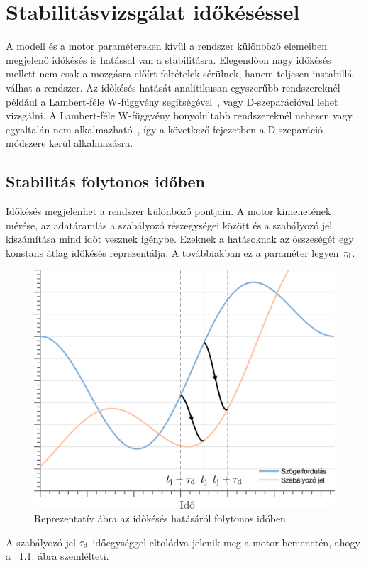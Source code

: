 \chapter{Stabilitásvizsgálat időkéséssel}\label{chap:time_delay_stability}

A modell és a motor paramétereken kívül a rendszer különböző elemeiben megjelenő időkésés 
is hatással van a stabilitásra. Elegendően nagy időkésés mellett nem csak a mozgásra előírt 
feltételek sérülnek, hanem teljesen instabillá válhat a rendszer. Az időkésés hatását analitikusan egyszerűbb 
rendszereknél például a Lambert-féle W-függvény segítségével~\cite{Yi2012, MatrixLambert2007}, 
vagy D-szeparációval lehet vizsgálni. A Lambert-féle W-függvény bonyolultabb rendszereknél nehezen 
vagy egyaltalán nem alkalmazható~\cite{CepedaGomez2015}, így a következő fejezetben a D-szeparáció módszere 
kerül alkalmazásra.

\section{Stabilitás folytonos időben}

Időkésés megjelenhet a rendszer különböző pontjain. A motor kimenetének mérése, az adatáramlás 
a szabályozó részegységei között és a szabályozó jel kiszámítása mind időt vesznek igénybe. 
Ezeknek a hatásoknak az összeségét egy konstans átlag időkésés reprezentálja. A továbbiakban ez a 
paraméter legyen \(\tau_{\mathrm{d}}\).
\begin{figure}[ht]
    \begin{center}
    \includegraphics[width=12cm]{images/time_delay_example.png}
    \caption{Reprezentatív ábra az időkésés hatásáról folytonos időben}\label{fig:time_delay_example}
    \end{center}
\end{figure}
A szabályozó jel \(\tau_{\mathrm{d}}\) időegységgel eltolódva jelenik meg a motor bemenetén, ahogy a
~\ref{fig:time_delay_example}. ábra szemlélteti.

